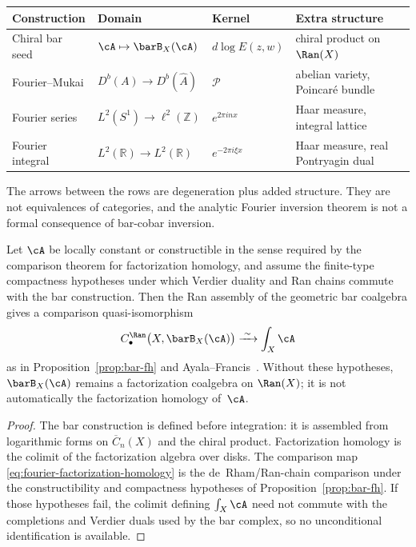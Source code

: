 \begin{remark}\label{rem:four-transforms}
\begin{center}
\small
\renewcommand{\arraystretch}{1.3}
\begin{tabular}{llll}
\textbf{Construction}
 & \textbf{Domain}
 & \textbf{Kernel}
 & \textbf{Extra structure} \\
\hline
Chiral bar seed
 & $\cA \mapsto \barB_X(\cA)$
 & $d\log E(z,w)$
 & chiral product on $\Ran(X)$ \\
Fourier--Mukai
 & $D^b(A) \to D^b(\hat{A})$
 & $\mathcal{P}$
 & abelian variety, Poincar\'e bundle \\
Fourier series
 & $L^2(S^1) \to \ell^2(\mathbb{Z})$
 & $e^{2\pi inx}$
 & Haar measure, integral lattice \\
Fourier integral
 & $L^2(\mathbb{R}) \to L^2(\mathbb{R})$
 & $e^{-2\pi i\xi x}$
 & Haar measure, real Pontryagin dual
\end{tabular}
\end{center}
The arrows between the rows are degeneration plus added structure.
They are not equivalences of categories, and the analytic Fourier
inversion theorem is not a formal consequence of bar-cobar inversion.
\end{remark}

\begin{proposition}
\label{prop:fourier-factorization-homology-scope}
Let $\cA$ be locally constant or constructible in the sense required
by the comparison theorem for factorization homology, and assume the
finite-type compactness hypotheses under which Verdier duality and
Ran chains commute with the bar construction. Then the Ran assembly of
the geometric bar coalgebra gives a comparison quasi-isomorphism
\begin{equation}\label{eq:fourier-factorization-homology}
C_\bullet^{\Ran}\bigl(X,\barB_X(\cA)\bigr)
\xrightarrow{\;\sim\;}
\int_X \cA
\end{equation}
as in Proposition~\ref{prop:bar-fh} and
Ayala--Francis~\cite{AF15}. Without these hypotheses,
$\barB_X(\cA)$ remains a factorization coalgebra on $\Ran(X)$; it is
not automatically the factorization homology of~$\cA$.
\end{proposition}

\begin{proof}
The bar construction is defined before integration: it is assembled
from logarithmic forms on $\overline{C}_n(X)$ and the chiral product.
Factorization homology is the colimit of the factorization algebra
over disks. The comparison map
\eqref{eq:fourier-factorization-homology} is the de~Rham/Ran-chain
comparison under the constructibility and compactness hypotheses of
Proposition~\ref{prop:bar-fh}. If those hypotheses fail, the colimit
defining $\int_X\cA$ need not commute with the completions and Verdier
duals used by the bar complex, so no unconditional identification is
available.
\end{proof}

